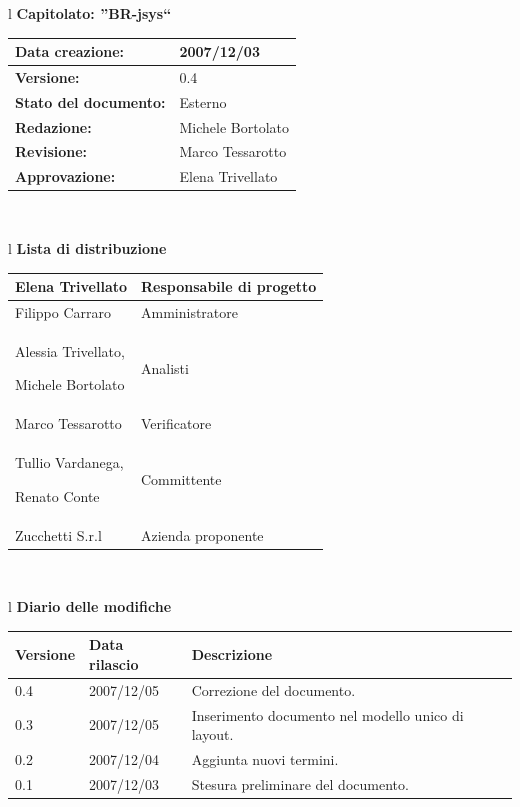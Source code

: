 \documentclass[11pt,titlepage,a4paper]{report}
\begin{document}
\begin{center}
\thispagestyle{plain}
\begin{table}[htbp]
\large{
\begin{tabular}{l}
\Large{\textbf{\textsf{Capitolato: ''BR-jsys``}}} \\
\begin{tabular}{||p{6cm}||p{6cm}||}
\hline
\textbf{Data creazione:} & 2007/12/03 \\
\hline
\textbf{Versione:} & 0.4 \\
\hline
\textbf{Stato del documento:} &Esterno \\
\hline
\textbf{Redazione:} & Michele Bortolato\\
\hline
\textbf{Revisione:} & Marco Tessarotto\\
\hline
\textbf{Approvazione:}  & Elena Trivellato\\
\hline
\end{tabular} \\
\end{tabular}
}
\end{table}

\begin{table}[hbtp]
\large{
\begin{tabular}{l}
\Large{\textbf{\textsf{Lista di distribuzione}}} \\
\begin{tabular}{||p{6cm}||p{6cm}||}
\hline
{Elena Trivellato}& Responsabile di progetto \\ 
\hline 
{Filippo Carraro}& Amministratore \\ 
\hline
{Alessia Trivellato, 

Michele Bortolato}& Analisti \\
\hline
{Marco Tessarotto}& Verificatore \\
\hline
{Tullio Vardanega,

Renato Conte}& Committente \\
\hline 
{Zucchetti S.r.l}& Azienda proponente\\
\hline
\hline
\end{tabular} \\
\end{tabular}
}
\end{table}

\begin{table}[hbtp]
\large{
\begin{tabular}{l}
\Large{\textbf{\textsf{Diario delle modifiche}}} \\
\begin{tabular}{||p{2cm}||p{3.5cm}||p{6cm}||}
\hline
\textbf{Versione} & \textbf{Data rilascio} & \textbf{Descrizione} \\
\hline
0.4 & 2007/12/05 & Correzione del documento. \\
\hline
0.3 & 2007/12/05 & Inserimento documento nel modello unico di layout. \\
\hline
0.2 & 2007/12/04 & Aggiunta nuovi termini. \\
\hline
0.1 & 2007/12/03 & Stesura preliminare del documento. \\
\hline


\end{tabular}
\end{tabular}}
\end{table}
\end{center}
\end{document}
